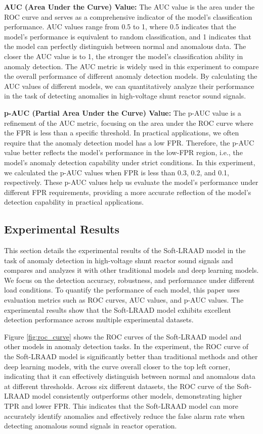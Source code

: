 \documentclass{article}
\begin{document}
\textbf{AUC (Area Under the Curve) Value:} The AUC value is the area under the ROC curve and serves as a comprehensive indicator of the model's classification performance. AUC values range from 0.5 to 1, where 0.5 indicates that the model's performance is equivalent to random classification, and 1 indicates that the model can perfectly distinguish between normal and anomalous data. The closer the AUC value is to 1, the stronger the model's classification ability in anomaly detection. The AUC metric is widely used in this experiment to compare the overall performance of different anomaly detection models. By calculating the AUC values of different models, we can quantitatively analyze their performance in the task of detecting anomalies in high-voltage shunt reactor sound signals.

\textbf{p-AUC (Partial Area Under the Curve) Value:} The p-AUC value is a refinement of the AUC metric, focusing on the area under the ROC curve where the FPR is less than a specific threshold. In practical applications, we often require that the anomaly detection model has a low FPR. Therefore, the p-AUC value better reflects the model's performance in the low-FPR region, i.e., the model's anomaly detection capability under strict conditions. In this experiment, we calculated the p-AUC values when FPR is less than 0.3, 0.2, and 0.1, respectively. These p-AUC values help us evaluate the model's performance under different FPR requirements, providing a more accurate reflection of the model's detection capability in practical applications.

\subsection{Experimental Results}

This section details the experimental results of the Soft-LRAAD model in the task of anomaly detection in high-voltage shunt reactor sound signals and compares and analyzes it with other traditional models and deep learning models. We focus on the detection accuracy, robustness, and performance under different load conditions. To quantify the performance of each model, this paper uses evaluation metrics such as ROC curves, AUC values, and p-AUC values. The experimental results show that the Soft-LRAAD model exhibits excellent detection performance across multiple experimental datasets.

Figure \ref{fig:roc_curve} shows the ROC curves of the Soft-LRAAD model and other models in anomaly detection tasks. In the experiment, the ROC curve of the Soft-LRAAD model is significantly better than traditional methods and other deep learning models, with the curve overall closer to the top left corner, indicating that it can effectively distinguish between normal and anomalous data at different thresholds. Across six different datasets, the ROC curve of the Soft-LRAAD model consistently outperforms other models, demonstrating higher TPR and lower FPR. This indicates that the Soft-LRAAD model can more accurately identify anomalies and effectively reduce the false alarm rate when detecting anomalous sound signals in reactor operation.
\end{document}
